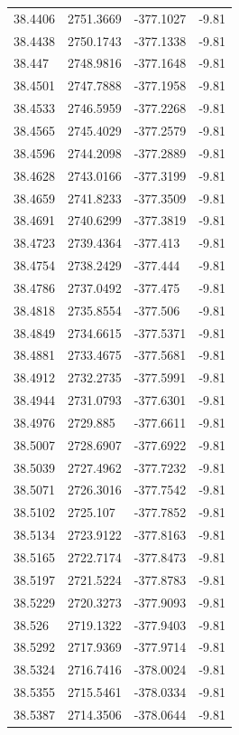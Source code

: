\begin{table}[H]
\begin{tabular}{llll}
38.4406 & 2751.3669 & -377.1027 & -9.81 \\
38.4438 & 2750.1743 & -377.1338 & -9.81 \\
38.447 & 2748.9816 & -377.1648 & -9.81 \\
38.4501 & 2747.7888 & -377.1958 & -9.81 \\
38.4533 & 2746.5959 & -377.2268 & -9.81 \\
38.4565 & 2745.4029 & -377.2579 & -9.81 \\
38.4596 & 2744.2098 & -377.2889 & -9.81 \\
38.4628 & 2743.0166 & -377.3199 & -9.81 \\
38.4659 & 2741.8233 & -377.3509 & -9.81 \\
38.4691 & 2740.6299 & -377.3819 & -9.81 \\
38.4723 & 2739.4364 & -377.413 & -9.81 \\
38.4754 & 2738.2429 & -377.444 & -9.81 \\
38.4786 & 2737.0492 & -377.475 & -9.81 \\
38.4818 & 2735.8554 & -377.506 & -9.81 \\
38.4849 & 2734.6615 & -377.5371 & -9.81 \\
38.4881 & 2733.4675 & -377.5681 & -9.81 \\
38.4912 & 2732.2735 & -377.5991 & -9.81 \\
38.4944 & 2731.0793 & -377.6301 & -9.81 \\
38.4976 & 2729.885 & -377.6611 & -9.81 \\
38.5007 & 2728.6907 & -377.6922 & -9.81 \\
38.5039 & 2727.4962 & -377.7232 & -9.81 \\
38.5071 & 2726.3016 & -377.7542 & -9.81 \\
38.5102 & 2725.107 & -377.7852 & -9.81 \\
38.5134 & 2723.9122 & -377.8163 & -9.81 \\
38.5165 & 2722.7174 & -377.8473 & -9.81 \\
38.5197 & 2721.5224 & -377.8783 & -9.81 \\
38.5229 & 2720.3273 & -377.9093 & -9.81 \\
38.526 & 2719.1322 & -377.9403 & -9.81 \\
38.5292 & 2717.9369 & -377.9714 & -9.81 \\
38.5324 & 2716.7416 & -378.0024 & -9.81 \\
38.5355 & 2715.5461 & -378.0334 & -9.81 \\
38.5387 & 2714.3506 & -378.0644 & -9.81 \\

\end{tabular}
\end{table}

